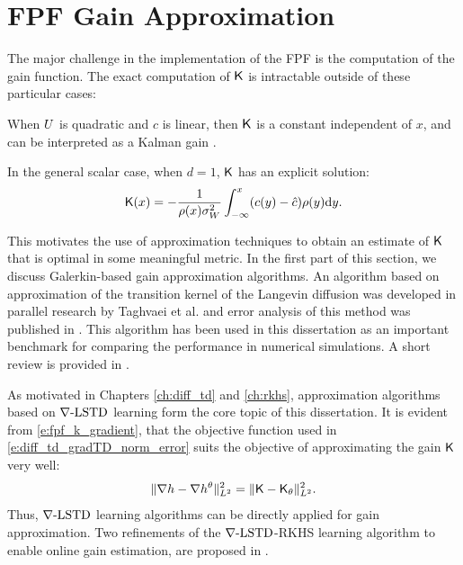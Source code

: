\section{FPF Gain Approximation}
The major challenge in the implementation of the FPF is the computation of the gain function. The exact computation of $\text{\sf K}$ is intractable outside of these particular cases:
\begin{romannum}
\item When $U$ is quadratic and $c$ is linear,  then $\text{\sf K}$ is a constant independent of $x$, and can be interpreted as a Kalman gain \cite{yanlaumehmey13}. 

\item In the general scalar case, when $d=1$, $\text{\sf K}$ has an explicit solution:
\begin{equation}
\kFPF(x) = - \frac{1}{\pr(x) \sigma_W^2} \int_{-\infty}^{x} (c(y) - \hat{c}) \pr(y) \ud y.
\label{e:fpf_gain_1d}
\end{equation}
\end{romannum}

This motivates the use of approximation techniques to obtain an estimate of $\text{\sf K}$ that is optimal in some meaningful metric. In the first part of this section, we discuss Galerkin-based gain approximation algorithms. An algorithm based on approximation of the transition kernel of the Langevin diffusion was developed in parallel research by Taghvaei et al. \cite{tagmeh16} and error analysis of this method was published in \cite{tagmehmey17}. This algorithm has been used in this dissertation as an important benchmark for comparing the performance in numerical simulations. A short review is provided in . 

As motivated in Chapters \ref{ch:diff_td} and \ref{ch:rkhs}, approximation algorithms based on $\nabla\text{-LSTD}$ learning form the core topic of this dissertation. It is evident from \eqref{e:fpf_k_gradient}, that the objective function used in \eqref{e:diff_td_gradTD_norm_error} suits the objective of approximating the gain $\text{\sf K}$ very well:
\begin{equation}
\| \nabla h - \nabla h^\theta \|^2_{L^2} = \| \text{\sf K} - \text{\sf K}_\theta \|^2_{L^2}.
\end{equation}
Thus, $\nabla\text{-LSTD}$ learning algorithms can be directly applied for gain approximation. Two refinements of the $\nabla\text{-LSTD}$-RKHS learning algorithm to enable online gain estimation, are proposed in .

